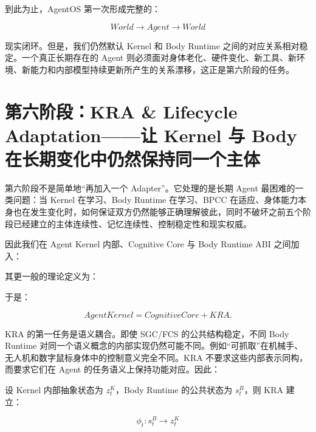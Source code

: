 到此为止，AgentOS 第一次形成完整的：

\[
World
\rightarrow
Agent
\rightarrow
World
\]

现实闭环。但是，我们仍然默认 Kernel 和 Body Runtime 之间的对应关系相对稳定。一个真正长期存在的 Agent 则必须面对身体老化、硬件变化、新工具、新环境、新能力和内部模型持续更新所产生的关系漂移，这正是第六阶段的任务。

\section{第六阶段：KRA \& Lifecycle Adaptation——让 Kernel 与 Body 在长期变化中仍然保持同一个主体}

第六阶段不是简单地“再加入一个 Adapter”。它处理的是长期 Agent 最困难的一类问题：当 Kernel 在学习、Body Runtime 在学习、BPCC 在适应、身体能力本身也在发生变化时，如何保证双方仍然能够正确理解彼此，同时不破坏之前五个阶段已经建立的主体连续性、记忆连续性、控制稳定性和现实权威。

因此我们在 Agent Kernel 内部、Cognitive Core 与 Body Runtime ABI 之间加入：

\begin{statementbox}
\centering
{}
\end{statementbox}

其更一般的理论定义为：

\begin{statementbox}
\centering
{}
\end{statementbox}

于是：

\[
AgentKernel
=
CognitiveCore
+
KRA.
\]

KRA 的第一任务是语义耦合。即使 SGC/FCS 的公共结构稳定，不同 Body Runtime 对同一个语义概念的内部实现仍然可能不同。例如“可抓取”在机械手、无人机和数字鼠标身体中的控制意义完全不同。KRA 不要求这些内部表示同构，而要求它们在 Agent 的任务语义上保持功能对应。因此：

\begin{statementbox}
\centering
{}
\end{statementbox}

设 Kernel 内部抽象状态为 \(z_t^K\)，Body Runtime 的公共状态为 \(s_t^B\)，则 KRA 建立：

\[
\phi_t:
s_t^B
\rightarrow
z_t^K
\]

